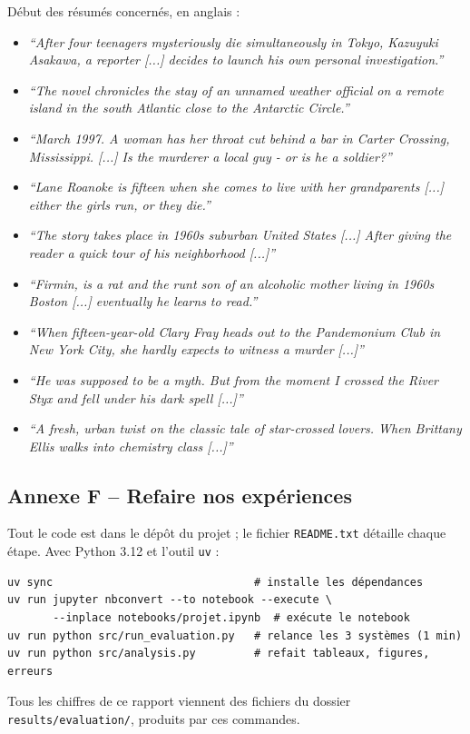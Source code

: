 \documentclass[11pt,a4paper]{article}
\begin{document}
Début des résumés concernés, en anglais :
\begin{itemize}\footnotesize
    \item[38] \textit{``After four teenagers mysteriously die simultaneously in Tokyo, Kazuyuki Asakawa, a reporter [...] decides to launch his own personal investigation.''}
    \item[379] \textit{``The novel chronicles the stay of an unnamed weather official on a remote island in the south Atlantic close to the Antarctic Circle.''}
    \item[236] \textit{``March 1997. A woman has her throat cut behind a bar in Carter Crossing, Mississippi. [...] Is the murderer a local guy - or is he a soldier?''}
    \item[219] \textit{``Lane Roanoke is fifteen when she comes to live with her grandparents [...] either the girls run, or they die.''}
    \item[436] \textit{``The story takes place in 1960s suburban United States [...] After giving the reader a quick tour of his neighborhood [...]''}
    \item[116] \textit{``Firmin, is a rat and the runt son of an alcoholic mother living in 1960s Boston [...] eventually he learns to read.''}
    \item[481] \textit{``When fifteen-year-old Clary Fray heads out to the Pandemonium Club in New York City, she hardly expects to witness a murder [...]''}
    \item[136] \textit{``He was supposed to be a myth. But from the moment I crossed the River Styx and fell under his dark spell [...]''}
    \item[12] \textit{``A fresh, urban twist on the classic tale of star-crossed lovers. When Brittany Ellis walks into chemistry class [...]''}
\end{itemize}

\subsection*{Annexe F -- Refaire nos expériences}
Tout le code est dans le dépôt du projet ; le fichier \texttt{README.txt} détaille chaque étape. Avec Python 3.12 et l'outil \texttt{uv} :
\begin{verbatim}
uv sync                               # installe les dépendances
uv run jupyter nbconvert --to notebook --execute \
       --inplace notebooks/projet.ipynb  # exécute le notebook
uv run python src/run_evaluation.py   # relance les 3 systèmes (1 min)
uv run python src/analysis.py         # refait tableaux, figures, erreurs
\end{verbatim}
Tous les chiffres de ce rapport viennent des fichiers du dossier \texttt{results/evaluation/}, produits par ces commandes.
\end{document}
